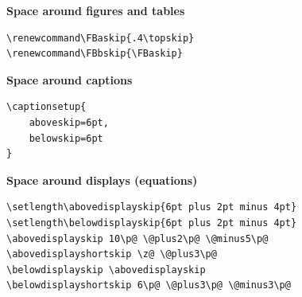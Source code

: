 \textbf{Space around figures and tables}

\begin{lstlisting}[style=kaolstplain]
\renewcommand\FBaskip{.4\topskip}
\renewcommand\FBbskip{\FBaskip}
\end{lstlisting}

\textbf{Space around captions}

\begin{lstlisting}[style=kaolstplain]
\captionsetup{
	aboveskip=6pt,
	belowskip=6pt
}
\end{lstlisting}

\textbf{Space around displays (\eg equations)}

\begin{lstlisting}[style=kaolstplain]
\setlength\abovedisplayskip{6pt plus 2pt minus 4pt}
\setlength\belowdisplayskip{6pt plus 2pt minus 4pt}
\abovedisplayskip 10\p@ \@plus2\p@ \@minus5\p@
\abovedisplayshortskip \z@ \@plus3\p@
\belowdisplayskip \abovedisplayskip
\belowdisplayshortskip 6\p@ \@plus3\p@ \@minus3\p@
\end{lstlisting}
